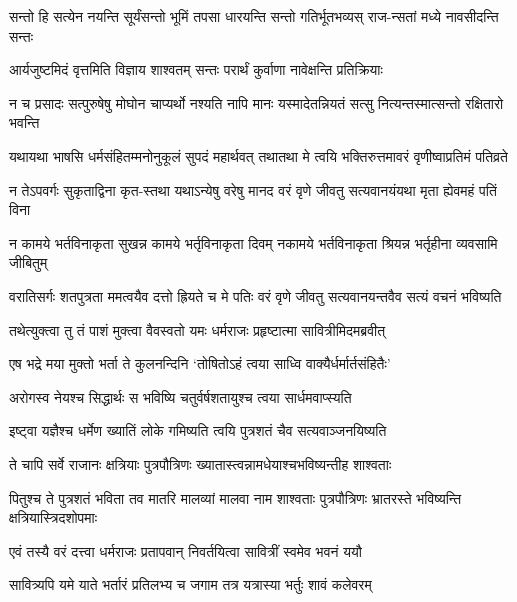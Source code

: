 \twolineshloka
{सन्तो हि सत्येन नयन्ति सूर्यंसन्तो भूमिं तपसा धारयन्ति}
{सन्तो गतिर्भूतभव्यस् राज-न्सतां मध्ये नावसीदन्ति सन्तः}


\twolineshloka
{आर्यजुष्टमिदं वृत्तमिति विज्ञाय शाश्वतम्}
{सन्तः परार्थं कुर्वाणा नावेक्षन्ति प्रतिक्रियाः}


\twolineshloka
{न च प्रसादः सत्पुरुषेषु मोघोन चाप्यर्थो नश्यति नापि मानः}
{यस्मादेतन्नियतं सत्सु नित्यन्तस्मात्सन्तो रक्षितारो भवन्ति}




\twolineshloka
{यथायथा भाषसि धर्मसंहितम्मनोनुकूलं सुपदं महार्थवत्}
{तथातथा मे त्वयि भक्तिरुत्तमावरं वृणीष्वाप्रतिमं पतिव्रते}




\twolineshloka
{न तेऽपवर्गः सुकृताद्विना कृत-स्तथा यथाऽन्येषु वरेषु मानद}
{वरं वृणे जीवतु सत्यवानयंयथा मृता ह्येवमहं पतिं विना}


\twolineshloka
{न कामये भर्तविनाकृता सुखन्न कामये भर्तृविनाकृता दिवम्}
{नकामये भर्तविनाकृता श्रियन्न भर्तृहीना व्यवसामि जीबितुम्}


\twolineshloka
{वरातिसर्गः शतपुत्रता ममत्वयैव दत्तो ह्रियते च मे पतिः}
{वरं वृणे जीवतु सत्यवानयन्तवैव सत्यं वचनं भविष्यति}




\twolineshloka
{तथेत्युक्त्वा तु तं पाशं मुक्त्वा वैवस्वतो यमः}
{धर्मराजः प्रहृष्टात्मा सावित्रीमिदमब्रवीत्}


\twolineshloka
{एष भद्रे मया मुक्तो भर्ता ते कुलनन्दिनि}
{`तोषितोऽहं त्वया साध्वि वाक्यैर्धर्मार्तसंहितैः'}


\twolineshloka
{अरोगस्व नेयश्च सिद्धार्थः स भविष्यि}
{चतुर्वर्षशतायुश्च त्वया सार्धमवाप्स्यति}


\twolineshloka
{इष्ट्वा यज्ञैश्च धर्मेण ख्यातिं लोके गमिष्यति}
{त्वयि पुत्रशतं चैव सत्यवाञ्जनयिष्यति}


\twolineshloka
{ते चापि सर्वे राजानः क्षत्रियाः पुत्रपौत्रिणः}
{ख्यातास्त्वन्नामधेयाश्चभविष्यन्तीह शाश्वताः}


\threelineshloka
{पितुश्च ते पुत्रशतं भविता तव मातरि}
{मालव्यां मालवा नाम शाश्वताः पुत्रपौत्रिणः}
{भ्रातरस्ते भविष्यन्ति क्षत्रियास्त्रिदशोपमाः}


\twolineshloka
{एवं तस्यै वरं दत्त्वा धर्मराजः प्रतापवान्}
{निवर्तयित्वा सावित्रीं स्वमेव भवनं ययौ}


\twolineshloka
{सावित्र्यपि यमे याते भर्तारं प्रतिलभ्य च}
{जगाम तत्र यत्रास्या भर्तुः शावं कलेवरम्}


